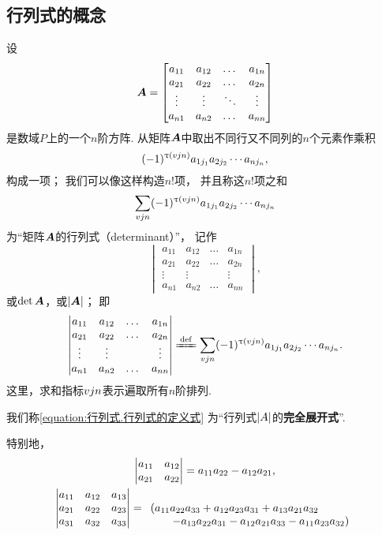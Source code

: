 \subsection{行列式的概念}
\begin{definition}
设
\[
\boldsymbol{A} = \begin{bmatrix}
a_{11} & a_{12} & \dots & a_{1n} \\
a_{21} & a_{22} & \dots & a_{2n} \\
\vdots & \vdots & \ddots & \vdots \\
a_{n1} & a_{n2} & \dots & a_{nn}
\end{bmatrix}
\]
是数域\(P\)上的一个\(n\)阶方阵.
从矩阵\(\boldsymbol{A}\)中取出不同行又不同列的\(n\)个元素作乘积
\[
(-1)^{\uptau(v{j}{n})}
a_{1 j_1} a_{2 j_2} \dotsm a_{n j_n},
\]
构成一项；%
我们可以像这样构造\(n!\)项，%
并且称这\(n!\)项之和\[
\sum\limits_{v{j}{n}}
(-1)^{\uptau(v{j}{n})}
a_{1 j_1} a_{2 j_2} \dotsm a_{n j_n}
\]为“矩阵\(\boldsymbol{A}\)的行列式（determinant）”，%
记作\[
\begin{vmatrix}
a_{11} & a_{12} & \dots & a_{1n} \\
a_{21} & a_{22} & \dots & a_{2n} \\
\vdots & \vdots & & \vdots \\
a_{n1} & a_{n2} & \dots & a_{nn}
\end{vmatrix},
\]或\(\det\boldsymbol{A}\)，或\(\abs{\boldsymbol{A}}\)；
即
\begin{equation}\label{equation:行列式.行列式的定义式}
\begin{vmatrix}
a_{11} & a_{12} & \dots & a_{1n} \\
a_{21} & a_{22} & \dots & a_{2n} \\
\vdots & \vdots & & \vdots \\
a_{n1} & a_{n2} & \dots & a_{nn}
\end{vmatrix}
\defeq
\sum\limits_{\v{j}{n}}
(-1)^{\tau(\v{j}{n})}
a_{1 j_1} a_{2 j_2} \dotsm a_{n j_n}.
\end{equation}
这里，求和指标\(v{j}{n}\)表示遍取所有\(n\)阶排列.

我们称\cref{equation:行列式.行列式的定义式}
为“行列式\(\abs{A}\)的\textbf{完全展开式}”.
\end{definition}

特别地，%
\begin{gather}
\begin{vmatrix}
a_{11} & a_{12} \\
a_{21} & a_{22}
\end{vmatrix}
= a_{11} a_{22} - a_{12} a_{21}, \\
\begin{vmatrix}
a_{11} & a_{12} & a_{13} \\
a_{21} & a_{22} & a_{23} \\
a_{31} & a_{32} & a_{33}
\end{vmatrix}
= \begin{array}[t]{l}
(a_{11} a_{22} a_{33} + a_{12} a_{23} a_{31} + a_{13} a_{21} a_{32} \\
\hspace{20pt}
- a_{13} a_{22} a_{31} - a_{12} a_{21} a_{33} - a_{11} a_{23} a_{32})
\end{array}
\end{gather}

